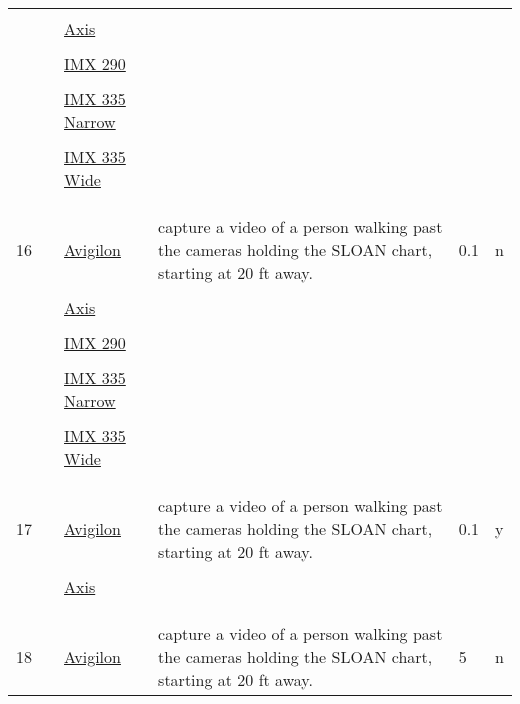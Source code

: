 \documentclass{article}%
\begin{document}
\begin{longtabu}{m{2.5cm} m{4cm} m{2cm} m{4cm} m{2cm} m{2cm}}
&&&&&\\%
&&\href{https://drive.google.com/file/d/1YXLg--dhQghqL3d_TlzZ0flOPOcy9o9Y/view?usp=sharing}{Axis}&&&\\%
&&&&&\\%
&&\href{}{IMX 290}&&&\\%
&&&&&\\%
&&\href{}{IMX 335 Narrow}&&&\\%
&&&&&\\%
&&\href{}{IMX 335 Wide}&&&\\%
&&&&&\\%
&&&&&\\%
\hline%
&&&&&\\%
16&&\href{https://drive.google.com/file/d/1SGPGBM5kewr4yCbzRcrTS8k3KuzkxLTE/view?usp=sharing}{Avigilon}&capture a video of a person walking past the cameras holding the SLOAN chart, starting at 20 ft away.&0.1&n\\%
&&&&&\\%
&&\href{https://drive.google.com/file/d/1sSFMN9RgH41Ack8QwPHl4toOK-yV0XCK/view?usp=sharing}{Axis}&&&\\%
&&&&&\\%
&&\href{https://drive.google.com/file/d/1_Dvqxgpe137cXFg3uEazDjb0ea0tQ2jb/view?usp=sharing}{IMX 290}&&&\\%
&&&&&\\%
&&\href{https://drive.google.com/file/d/1uF-_dqiH_tXvskZToknHZdxHpJjvsEgX/view?usp=sharing}{IMX 335 Narrow}&&&\\%
&&&&&\\%
&&\href{https://drive.google.com/file/d/1cMuoQb0DX44kbr-UMbuoYcuFh-sQO3az/view?usp=sharing}{IMX 335 Wide}&&&\\%
&&&&&\\%
&&&&&\\%
\hline%
&&&&&\\%
17&&\href{https://drive.google.com/file/d/1ysMhKLIEl8WZ-GuwNVj6OU-vUJPTcZy5/view?usp=sharing}{Avigilon}&capture a video of a person walking past the cameras holding the SLOAN chart, starting at 20 ft away.&0.1&y\\%
&&&&&\\%
&&\href{https://drive.google.com/file/d/1y16gl53QlUrYQUzVqQ83XF5BGqz7V7Fq/view?usp=sharing}{Axis}&&&\\%
&&&&&\\%
&&&&&\\%
\hline%
&&&&&\\%
18&&\href{https://drive.google.com/file/d/1M6a9LU_WlpOEVO1sdOCVRsjKHcKuhWdT/view?usp=sharing}{Avigilon}&capture a video of a person walking past the cameras holding the SLOAN chart, starting at 20 ft away.&5&n\\%

\end{longtabu}
\end{document}
